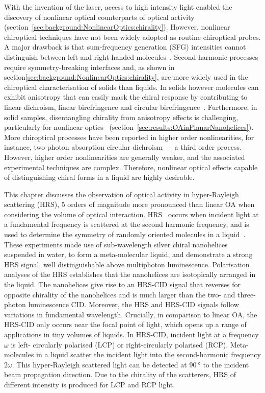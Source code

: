 With the invention of the laser, access to high intensity light enabled the discovery of nonlinear optical counterparts of optical activity (section~\ref{sec:background:NonlinearOptics:chirality}). However, nonlinear chiroptical techniques have not been widely adopted as routine chiroptical probes. A major drawback is that sum-frequency generation (SFG) intensities cannot distinguish between left and right-handed molecules~\cite{Valev2013b}. 
Second-harmonic processes require symmetry-breaking interfaces and, as shown in section\ref{sec:background:NonlinearOptics:chirality}, are more widely used in the chiroptical characterisation of solids than liquids. In solids however molecules can exhibit anisotropy that can easily mask the chiral response by contributing to linear dichroism, linear birefringence and circular birefringence~\cite{Kuroda2001}.
Furthermore, in solid samples, disentangling chirality from anisotropy effects is challenging, particularly for nonlinear optics~\cite{Hooper2017} (section~\ref{sec:results:OAinPlanarNanohelices}). More chiroptical processes have been reported in higher order nonlinearities, for instance, two-photon absorption circular dichroism~\cite{Tinoco1975, DeBoni2008, Toro2010} – a third order process. However, higher order nonlinearities are generally weaker, and the associated experimental techniques are complex. Therefore, nonlinear optical effects capable of distinguishing chiral forms in a liquid are highly desirable. 

This chapter discusses the observation of optical activity in hyper-Rayleigh scattering (HRS), 5 orders of magnitude more pronounced than linear OA when considering the volume of optical interaction. HRS~\cite{Clays1991b, Clays1992} occurs when incident light at a fundamental frequency is scattered at the second harmonic frequency, and is used to determine the symmetry of randomly oriented molecules in a liquid~\cite{Verbiest1994a}.
These experiments made use of sub-wavelength silver chiral nanohelices suspended in water, to form a meta-molecular liquid, and demonstrate a strong HRS signal, well distinguishable above multiphoton luminescence. Polarisation analyses of the HRS establishes that the nanohelices are isotopically arranged in the liquid. The nanohelices give rise to an HRS-CID signal that reverses for opposite chirality of the nanohelices and is much larger than the two- and three-photon luminescence CID. Moreover, the HRS and HRS-CID signals follow variations in fundamental wavelength. Crucially, in comparison to linear OA, the HRS-CID only occurs near the focal point of light, which opens up a range of applications in tiny volumes of liquids. 
In HRS-CID, incident light at a frequency $\omega$ is left- circularly polarised (LCP) or right-circularly polarised (RCP). Meta-molecules in a liquid scatter the incident light into the second-harmonic frequency $2\omega$. This hyper-Rayleigh scattered light can be detected at $\SI{90}{\degree}$ to the incident beam propagation direction. Due to the chirality of the scatterers, HRS of different intensity is produced for LCP and RCP light.


